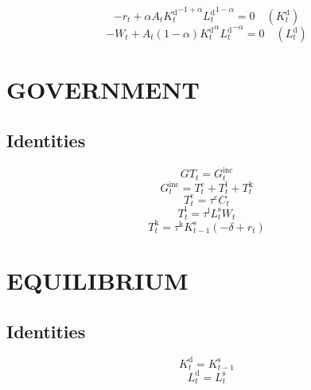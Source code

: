 \begin{equation}
-r_{t} + {\alpha} {A_{t}} {{K^{\mathrm{d}}_{t}}^{-1 + \alpha}} {{L^{\mathrm{d}}_{t}}^{1 - \alpha}} = 0
 \quad \left(K^{\mathrm{d}}_{t}\right)
\end{equation}
\begin{equation}
-W_{t} + {A_{t}} \left(1 - \alpha\right) {{K^{\mathrm{d}}_{t}}^{\alpha}} {{L^{\mathrm{d}}_{t}}^{-\alpha}} = 0
 \quad \left(L^{\mathrm{d}}_{t}\right)
\end{equation}




\section{GOVERNMENT}

\subsection{Identities}

\begin{equation}
{G\!T}_{t} = G^{\mathrm{inc}}_{t}
\end{equation}
\begin{equation}
G^{\mathrm{inc}}_{t} = T^{\mathrm{c}}_{t} + T^{\mathrm{l}}_{t} + T^{\mathrm{k}}_{t}
\end{equation}
\begin{equation}
T^{\mathrm{c}}_{t} = {\tau^{\mathrm{c}}} {C_{t}}
\end{equation}
\begin{equation}
T^{\mathrm{l}}_{t} = {\tau^{\mathrm{l}}} {L^{\mathrm{s}}_{t}} {W_{t}}
\end{equation}
\begin{equation}
T^{\mathrm{k}}_{t} = {\tau^{\mathrm{k}}} {K^{\mathrm{s}}_{t-1}} \left(-\delta + r_{t}\right)
\end{equation}




\section{EQUILIBRIUM}

\subsection{Identities}

\begin{equation}
K^{\mathrm{d}}_{t} = K^{\mathrm{s}}_{t-1}
\end{equation}
\begin{equation}
L^{\mathrm{d}}_{t} = L^{\mathrm{s}}_{t}
\end{equation}




